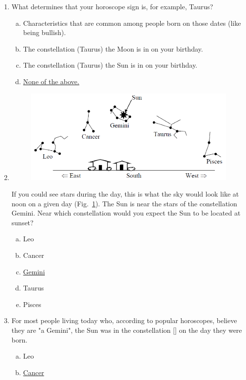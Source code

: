 \documentclass[12pt]{article}
\begin{document}
\begin{enumerate}
\item
What determines that your horoscope sign is, for example, Taurus?
\begin{enumerate}[a.]
    \item Characteristics that are common among people born on those dates (like being bullish).
    \item The constellation (Taurus) the Moon is in on your birthday.
    \item The constellation (Taurus) the Sun is in on your birthday.
    \item \underline{None of the above.}
\end{enumerate}
\item
\begin{figure}[htbp]
    \centering
    \includegraphics{asq8.png}
    \caption{}
    \label{fig:l7q2}
\end{figure}
If you could see stars during the day, this is what the sky would look like at noon on a given day (Fig.~\ref{fig:l7q2}). The Sun is near the stars of the constellation Gemini. Near which constellation would you expect the Sun to be located at sunset?
\begin{enumerate}[a.]
    \item Leo
    \item Cancer
    \item \underline{Gemini}
    \item Taurus
    \item Pisces
\end{enumerate}
\item
For most people living today who, according to popular horoscopes, believe they are "a Gemini", the Sun was in the constellation [] on the day they were born.
\begin{enumerate}[a.]
    \item Leo
    \item \underline{Cancer}

\end{enumerate}
\end{enumerate}
\end{document}
